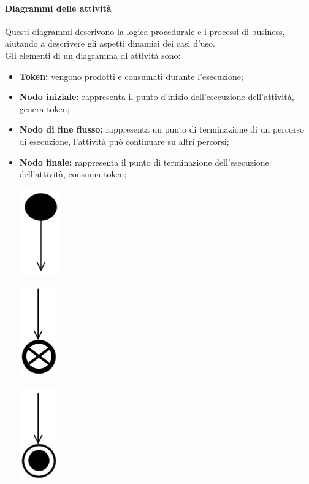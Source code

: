 \paragraph*{Diagrammi delle attività}
Questi diagrammi descrivono la logica procedurale e i processi di business, aiutando a descrivere gli aspetti dinamici dei casi d'uso.\\
Gli elementi di un diagramma di attività sono:
\begin{itemize}
	\item \textbf{Token:} vengono prodotti e consumati durante l'esecuzione;
	\item \textbf{Nodo iniziale:} rappresenta il punto d'inizio dell'esecuzione dell'attività, genera token;
	\item \textbf{Nodo di fine flusso:} rappresenta un punto di terminazione di un percorso di esecuzione, l'attività può continuare su altri percorsi;
	\item \textbf{Nodo finale:} rappresenta il punto di terminazione dell'esecuzione dell'attività, consuma token;
	\begin{center}
		\begin{minipage}{0.3\textwidth}
			\centering
			\includegraphics[scale=0.2]{Immagini/UML/NodoIniziale}
		\end{minipage}
		\begin{minipage}{0.3\textwidth}
			\centering
			\includegraphics[scale=0.2]{Immagini/UML/NodoFineFlusso}
		\end{minipage}
		\begin{minipage}{0.3\textwidth}
			\centering
			\includegraphics[scale=0.19]{Immagini/UML/NodoFinale}

\end{minipage}
\end{center}
\end{itemize}
